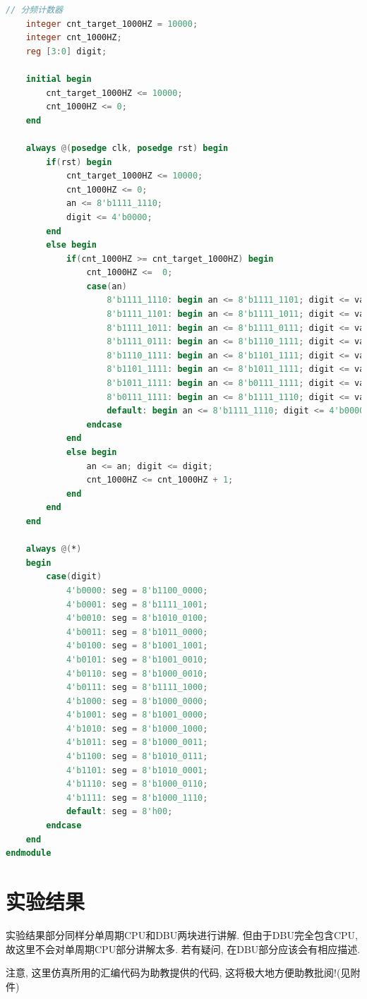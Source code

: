 \documentclass[UTF8]{article}
\begin{document}
\begin{enumerate}
\begin{lstlisting}[language=verilog]
    // 分频计数器
    integer cnt_target_1000HZ = 10000;
    integer cnt_1000HZ;
    reg [3:0] digit;
    
    initial begin
        cnt_target_1000HZ <= 10000;
        cnt_1000HZ <= 0;
    end
    
    always @(posedge clk, posedge rst) begin
        if(rst) begin
            cnt_target_1000HZ <= 10000;
            cnt_1000HZ <= 0;
            an <= 8'b1111_1110;
            digit <= 4'b0000;
        end
        else begin
            if(cnt_1000HZ >= cnt_target_1000HZ) begin
                cnt_1000HZ <=  0;
                case(an)
                    8'b1111_1110: begin an <= 8'b1111_1101; digit <= value[31:27]; end
                    8'b1111_1101: begin an <= 8'b1111_1011; digit <= value[3:0]; end
                    8'b1111_1011: begin an <= 8'b1111_0111; digit <= value[7:3]; end
                    8'b1111_0111: begin an <= 8'b1110_1111; digit <= value[11:7]; end
                    8'b1110_1111: begin an <= 8'b1101_1111; digit <= value[15:11]; end
                    8'b1101_1111: begin an <= 8'b1011_1111; digit <= value[19:15]; end
                    8'b1011_1111: begin an <= 8'b0111_1111; digit <= value[23:19]; end
                    8'b0111_1111: begin an <= 8'b1111_1110; digit <= value[27:23]; end
                    default: begin an <= 8'b1111_1110; digit <= 4'b0000; end
                endcase
            end
            else begin
                an <= an; digit <= digit;
                cnt_1000HZ <= cnt_1000HZ + 1;
            end
        end
    end
    
    always @(*)
    begin
        case(digit)
            4'b0000: seg = 8'b1100_0000;
            4'b0001: seg = 8'b1111_1001;
            4'b0010: seg = 8'b1010_0100;
            4'b0011: seg = 8'b1011_0000;
            4'b0100: seg = 8'b1001_1001;
            4'b0101: seg = 8'b1001_0010;
            4'b0110: seg = 8'b1000_0010;
            4'b0111: seg = 8'b1111_1000;
            4'b1000: seg = 8'b1000_0000;
            4'b1001: seg = 8'b1001_0000;
            4'b1010: seg = 8'b1000_1000;
            4'b1011: seg = 8'b1000_0011;
            4'b1100: seg = 8'b1010_0111;
            4'b1101: seg = 8'b1010_0001;
            4'b1110: seg = 8'b1000_0110;
            4'b1111: seg = 8'b1000_1110;
            default: seg = 8'h00;
        endcase
    end
endmodule
	\end{lstlisting}
\end{enumerate}

\section{实验结果}
实验结果部分同样分单周期CPU和DBU两块进行讲解. 但由于DBU完全包含CPU, 故这里不会对单周期CPU部分讲解太多. 若有疑问, 在DBU部分应该会有相应描述.\par
注意, 这里仿真所用的汇编代码为助教提供的代码, 这将极大地方便助教批阅!(见附件)\par
\end{document}
